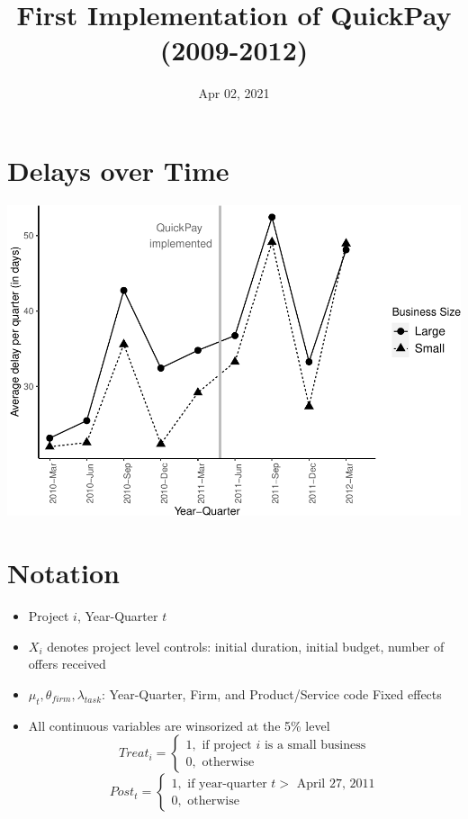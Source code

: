 \documentclass[
]{article}
\title{First Implementation of QuickPay (2009-2012)}
\author{}
\date{\vspace{-2.5em}Apr 02, 2021}
\providecommand{\tightlist}{%
  \setlength{\itemsep}{0pt}\setlength{\parskip}{0pt}}
\begin{document}
\maketitle

\hypertarget{delays-over-time}{%
\section{Delays over Time}\label{delays-over-time}}

\includegraphics{qp_first_implementation_files/figure-latex/plot-1.pdf}

\hypertarget{notation}{%
\section{Notation}\label{notation}}

\begin{itemize}
\tightlist
\item
  Project \(i\), Year-Quarter \(t\)
\item
  \(X_i\) denotes project level controls: initial duration, initial
  budget, number of offers received
\item
  \(\mu_t,\theta_{firm},\lambda_{task}\): Year-Quarter, Firm, and
  Product/Service code Fixed effects
\item
  All continuous variables are winsorized at the 5\% level
  \[ Treat_i = \begin{cases} 1, \text{ if project } i \text{ is a small business}\\
  0, \text{ otherwise} \end{cases}\]
  \[ Post_t = \begin{cases} 1, \text{ if year-quarter } t > \text{ April 27, 2011}\\
  0, \text{ otherwise} \end{cases}\]
\end{itemize}
\end{document}
